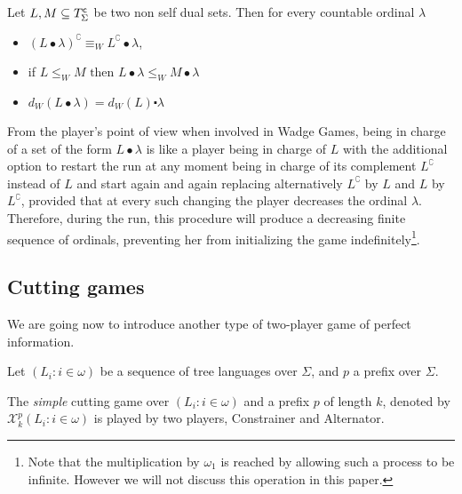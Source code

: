 \begin{remark}
\label{r_mult}
Let $L, M\subseteq T^{\sf c}_\Sigma$ be two non self dual sets. Then for every countable ordinal $\lambda$
\begin{itemize}
\item $(L\bullet \lambda)^\complement \equiv_W L^\complement \bullet \lambda$,
\item if $L \leq_W M\text{ then } L\bullet \lambda \leq_W M\bullet \lambda$
\item $d_W(L \bullet \lambda)= d_W(L) \centerdot \lambda$
\end{itemize}
\end{remark}


From the player's point of view when involved in Wadge Games, being in charge of a set of the form $L\bullet \lambda$ is like a player being in charge of $L$ with the additional option to restart the run at any moment being 
in charge of its complement $L^\complement$ instead of $L$ and start again and again replacing alternatively $L^\complement$ by $L$ and  $L$ by 
$L^\complement$,  provided that at every such changing the player decreases the ordinal $\lambda$.  Therefore, during the run, this procedure will produce a decreasing finite sequence of ordinals, preventing her from initializing the game indefinitely\footnote{ 
Note that the multiplication by $\omega_1$ is reached  by allowing such a process to be infinite. However we will not discuss this operation in this paper.}.




\subsection{Cutting games}

We are going now to introduce another type of two-player game of perfect information. 

Let $( L_i : i \in \omega )$ be a sequence of tree languages over $\Sigma$, and $p$ a prefix over $\Sigma$. 

The \emph{simple} cutting game over $( L_i : i \in \omega )$ and a prefix $p$ of length $k$, denoted by $\mathcal{X}^p_k(L_i : i \in \omega )$ is played by two players, Constrainer and Alternator.

